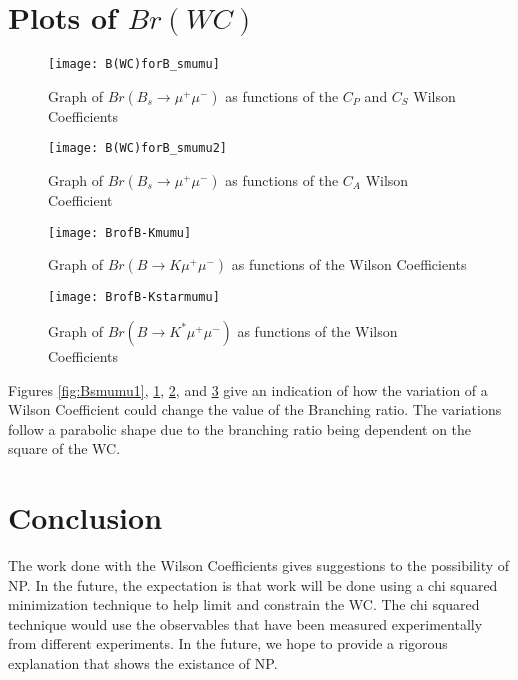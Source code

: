 \documentclass[12pt]{article}
\begin{document}
\section{Plots of $Br(WC)$}
\begin{figure}[htbp!]
\centering
\texttt{[image: B(WC)forB\_smumu]}
\caption{Graph of $Br(B_s\rightarrow \mu^+\mu^-)$ as functions of the $C_P$ and $C_S$ Wilson Coefficients}
\label{fig:Bsmumu1}
\centering
\texttt{[image: B(WC)forB\_smumu2]}
\caption{Graph of $Br(B_s\rightarrow \mu^+\mu^-)$ as functions of the $C_A$ Wilson Coefficient}
\label{fig:Bsmumu2}
\end{figure}
\begin{figure}[htbp!]
\centering
\texttt{[image: BrofB-Kmumu]}
\caption{Graph of $Br(B\rightarrow K\mu^+\mu^-)$ as functions of the Wilson Coefficients}
\label{fig:Bkmumu}
\end{figure}
\begin{figure}
\centering
\texttt{[image: BrofB-Kstarmumu]}
\caption{Graph of $Br(B\rightarrow K^*\mu^+\mu^-)$ as functions of the Wilson Coefficients}
\label{fig:bKstarmumu}
\end{figure}
Figures \ref{fig:Bsmumu1}, \ref{fig:Bsmumu2}, \ref{fig:Bkmumu}, and \ref{fig:bKstarmumu} give an indication of how the variation of a Wilson Coefficient could change the value of the Branching ratio. The variations follow a parabolic shape due to the branching ratio being dependent on the square of the WC.
\newpage
\section{Conclusion}
The work done with the Wilson Coefficients gives suggestions to the possibility of NP. In the future, the expectation is that work will be done using a chi squared minimization technique to help limit and constrain the WC. The chi squared technique would use the observables that have been measured experimentally from different experiments. In the future, we hope to provide a rigorous explanation that shows the existance of NP.  
\end{document}
